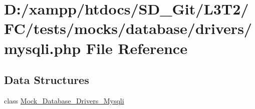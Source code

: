 \hypertarget{tests_2mocks_2database_2drivers_2mysqli_8php}{}\section{D\+:/xampp/htdocs/\+S\+D\+\_\+\+Git/\+L3\+T2/\+F\+C/tests/mocks/database/drivers/mysqli.php File Reference}
\label{tests_2mocks_2database_2drivers_2mysqli_8php}
\subsection*{Data Structures}
\begin{DoxyCompactItemize}
\item 
class \hyperlink{class_mock___database___drivers___mysqli}{Mock\+\_\+\+Database\+\_\+\+Drivers\+\_\+\+Mysqli}
\end{DoxyCompactItemize}
